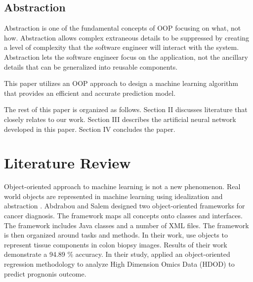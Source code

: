 \documentclass[journal]{IEEEtran}
\begin{document}


\subsection{Abstraction}
Abstraction is one of the fundamental concepts of 
OOP focusing on what, not how.  Abstraction allows complex extraneous details to be suppressed by creating a level of complexity that the software engineer will interact with the system.  Abstraction lets the software engineer focus on the application, not the ancillary details that can be %
generalized into reusable components.


This paper utilizes an OOP approach to design a machine learning algorithm that provides an efficient and accurate prediction model. %

The rest of this paper is organized as follows. Section II discusses literature that closely relates to our work. Section III describes the artificial neural network developed in this paper. Section IV concludes the paper. %



\section{Literature Review}
Object-oriented approach to machine learning is not a new phenomenon. Real world objects are represented in machine learning using idealization and abstraction \cite{tuncc2015semantics}.
Abdrabou and Salem \cite{abdrabou2010breast} designed two object-oriented frameworks for cancer diagnosis. The framework maps all concepts onto classes and interfaces. The framework includes Java classes and a number of XML files. The framework is then organized around tasks and methods. 
In their work, \cite{tosun2009object} use objects to represent tissue components in colon biopsy images. Results of their work demonstrate a 94.89 \% accuracy.
In their study, \cite{zhao2016object} applied an object-oriented regression methodology to analyze High Dimension Omics Data (HDOD) to predict prognonis outcome.
\end{document}
